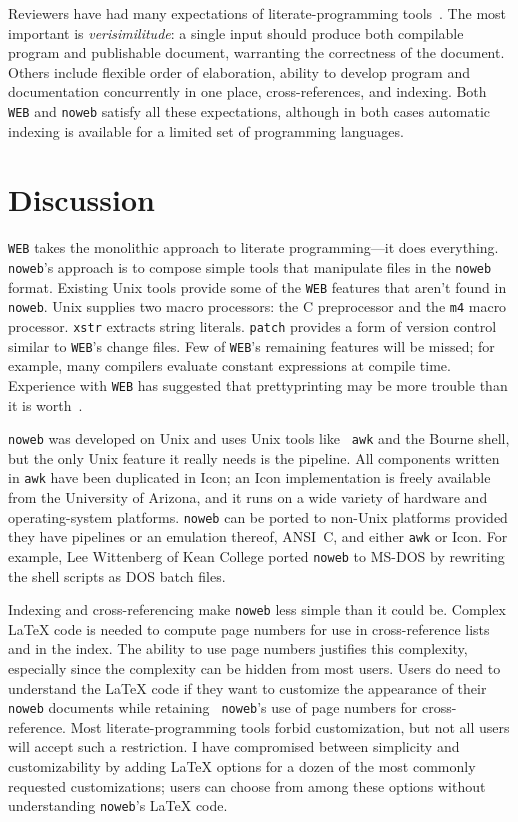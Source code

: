 Reviewers have had many expectations of literate-programming
tools~\cite{thimbleby:review,cvw:assessment}.
The most important is {\em verisimilitude}: a single
input should produce both compilable program and publishable document,
warranting the correctness of the document.
Others include flexible order of elaboration,
ability to develop program and documentation concurrently in one
place, cross-references, and indexing.
Both {\tt WEB} and {\tt noweb}
satisfy all these expectations, although in both cases automatic
indexing is available for a limited set of programming languages.


\section{Discussion}

{\tt WEB} takes the monolithic approach to literate programming---it
does everything.
{\tt noweb}'s approach is to compose
simple tools that manipulate files in the {\tt noweb} format.
Existing Unix tools provide some of the {\tt WEB} features that
aren't found in \verb+noweb+.
Unix supplies two macro processors: the C
preprocessor and the \verb+m4+ macro processor.
\verb+xstr+ extracts string literals.
\verb+patch+ provides a form of version control similar to {\tt WEB}'s
change files.
Few of {\tt WEB}'s remaining features will be missed; for example, many compilers
evaluate constant expressions at compile time.
Experience with {\tt WEB} has suggested that prettyprinting may be
more trouble than it is worth~\cite{ramsey:literate}.

{\tt noweb} was developed on Unix and uses Unix tools like {\tt
awk} and the Bourne shell, but the only Unix feature it really needs
is the pipeline.
All components written in {\tt awk} have been duplicated in Icon;
an Icon implementation is freely available from the University of Arizona, and
it runs on a wide variety of hardware and operating-system platforms.
{\tt noweb} can be ported to non-Unix platforms provided they have
pipelines or an emulation thereof, ANSI~C, and either {\tt awk} or Icon.
For example,
Lee Wittenberg of Kean College ported {\tt noweb} to MS-DOS by
rewriting the shell scripts as DOS batch files.

Indexing and cross-referencing make
{\tt noweb} less simple than it could be.
Complex {\LaTeX} code is needed to compute page numbers for use in
cross-reference lists and in the index.
The ability to use page numbers justifies this complexity, especially
since the complexity can be hidden from most users.
Users do need to understand the {\LaTeX} code if they want to customize the
appearance of their {\tt noweb} documents while retaining {\tt
noweb}'s use of page numbers for cross-reference.
Most literate-programming tools
forbid customization, but not all users will accept such a restriction.
I have compromised between simplicity and customizability by adding
{\LaTeX} options for a dozen of the most commonly requested
customizations; users can choose from among these options without
understanding {\tt noweb}'s {\LaTeX} code.



